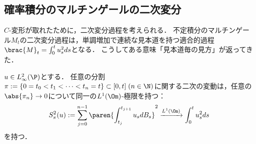 \documentclass[uplatex,dvipdfmx]{jsreport}
\begin{document}
\subsection{確率積分のマルチンゲールの二次変分}

\begin{tcolorbox}[colframe=ForestGreen, colback=ForestGreen!10!white,breakable,colbacktitle=ForestGreen!40!white,coltitle=black,fonttitle=\bfseries\sffamily,
title=]
    $C$-変形が取れたために，二次変分過程を考えられる．
    不定積分のマルチンゲール$M_t$の二次変分過程は，単調増加で連続な見本道を持つ適合的過程$\brac{M}_t=\int^t_0u_s^2ds$となる．
    こうしてある意味「見本道毎の見方」が返ってきた．
\end{tcolorbox}

\begin{proposition}[二次変分]\label{prop-quadratic-covariation-of-the-martingale-of-SI}
    $u\in L^2_\infty(\P)$とする．
    任意の分割$\pi:=\{0=t_0<t_1<\cdots<t_n=t\}\subset[0,t]\;(n\in\N)$に関する二次の変動は，任意の$\abs{\pi_n}\to0$について同一の$L^1(\Om)$-極限を持つ：
    \[S^2_\pi(u):=\sum^{n-1}_{j=0}\paren{\int^{t_{j+1}}_{t_j}u_sdB_s}^2\xrightarrow{L^1(\Om)}\int^t_0u^2_sds\]
    を持つ．
\end{proposition}
\end{document}
